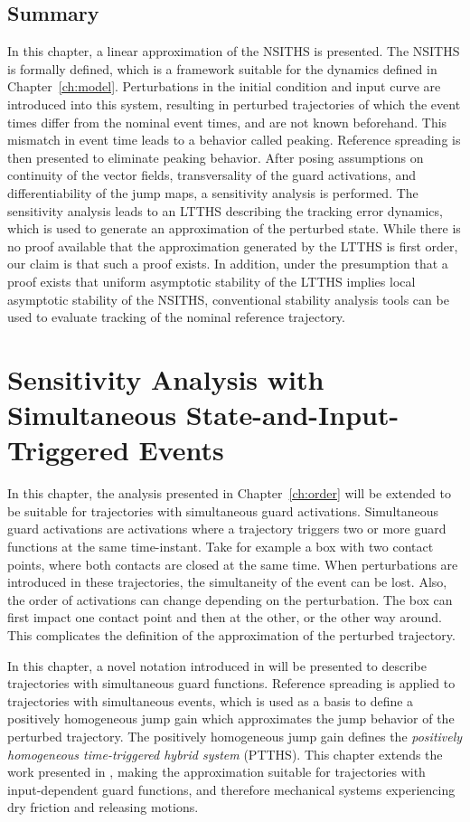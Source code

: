 \documentclass[../DC2017114Bouma.tex]{subfiles}
\begin{document}
\section{Summary}
In this chapter, a linear approximation of the NSITHS is presented. The NSITHS is formally defined, which is a framework suitable for the dynamics defined in Chapter~\ref{ch:model}. Perturbations in the initial condition and input curve are introduced into this system, resulting in perturbed trajectories of which the event times differ from the nominal event times, and are not known beforehand. This mismatch in event time leads to a behavior called peaking. Reference spreading is then presented to eliminate peaking behavior. After posing assumptions on continuity of the vector fields, transversality of the guard activations, and differentiability of the jump maps, a sensitivity analysis is performed. The sensitivity analysis leads to an LTTHS describing the tracking error dynamics, which is used to generate an approximation of the perturbed state. While there is no proof available that the approximation generated by the LTTHS is first order, our claim is that such a proof exists. In addition, under the presumption that a proof exists that uniform asymptotic stability of the LTTHS implies local asymptotic stability of the NSITHS, conventional stability analysis tools can be used to evaluate tracking of the nominal reference trajectory.


\cleartooddpage
\chapter{Sensitivity Analysis with Simultaneous State-and-Input-Triggered Events}\label{ch:simult}
In this chapter, the analysis presented in Chapter~\ref{ch:order} will be extended to be suitable for trajectories with simultaneous guard activations. Simultaneous guard activations are activations where a trajectory triggers two or more guard functions at the same time-instant. Take for example a box with two contact points, where both contacts are closed at the same time. When perturbations are introduced in these trajectories, the simultaneity of the event can be lost. Also, the order of activations can change depending on the perturbation. The box can first impact one contact point and then at the other, or the other way around. This complicates the definition of the approximation of the perturbed trajectory. 

In this chapter, a novel notation introduced in \cite{Rijnen2018} will be presented to describe trajectories with simultaneous guard functions. Reference spreading is applied to trajectories with simultaneous events, which is used as a basis to define a positively homogeneous jump gain which approximates the jump behavior of the perturbed trajectory. The positively homogeneous jump gain defines the \textit{positively homogeneous time-triggered hybrid system} (PTTHS). This chapter extends the work presented in \cite{Rijnen2018}, making the approximation suitable for trajectories with input-dependent guard functions, and therefore mechanical systems experiencing dry friction and releasing motions.
\end{document}
